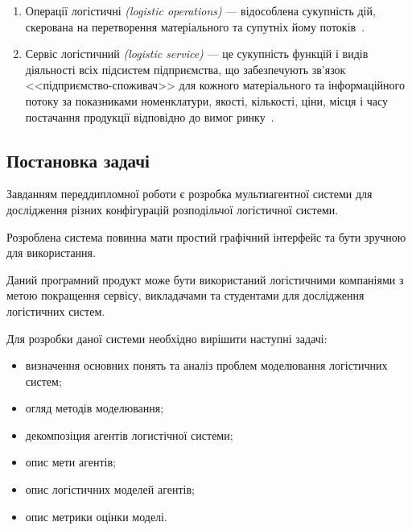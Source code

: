 \begin{enumerate}
    \item Операції логістичні \textit{(logistic operations)} --- відособлена сукупність дій, скерована на перетворення матеріального та супутніх йому потоків~\cite{Kusluy2010}.
    \item Сервіс логістичний \textit{(logistic service)} --- це сукупність функцій і видів діяльності всіх підсистем підприємства, що забезпечують зв’язок <<підприємство-споживач>> для кожного матеріального та інформаційного потоку за показниками номенклатури, якості, кількості, ціни, місця і часу постачання продукції відповідно до вимог ринку~\cite{Kusluy2010}.
\end{enumerate}

\subsection{Постановка задачі}
Завданням переддипломної роботи є розробка мультиагентної системи для дослідження різних конфігурацій розподільчої логістичної системи.

Розроблена система повинна мати простий графічний інтерфейс та бути зручною для використання. 

Даний програмний продукт може бути використаний логістичними компаніями з метою покращення сервісу, викладачами та студентами для дослідження логістичних систем.

Для розробки даної системи необхідно вирішити наступні задачі:
\begin{itemize}
	\item визначення основних понять та аналіз проблем моделювання логістичних систем;
	\item огляд методів моделювання;
	\item декомпозіция агентів логистічної системи;
	\item опис мети агентів;
	\item опис логістичних моделей агентів;
	\item опис метрики оцінки моделі.
\end{itemize}
